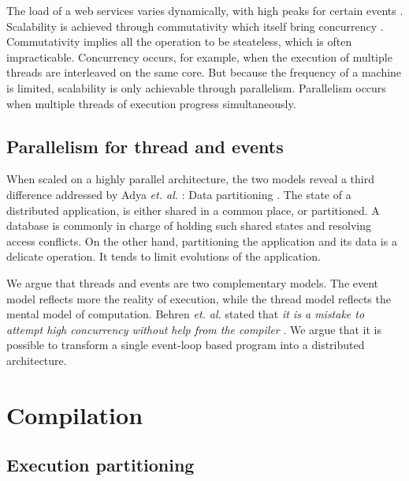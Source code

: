 The load of a web services varies dynamically, with high peaks for certain events%
.
Scalability is achieved through commutativity which itself bring concurrency \cite{Clements2013a}.
Commutativity implies all the operation to be steateless, which is often impracticable.
Concurrency occurs, for example, when the execution of multiple threads are interleaved on the same core.
But because the frequency of a machine is limited, scalability is only achievable through parallelism.
Parallelism occurs when multiple threads of execution progress simultaneously.

\subsection{Parallelism for thread and events}

When scaled on a highly parallel architecture, the two models reveal a third difference addressed by Adya \textit{et. al.} : Data partitioning \cite{Adya2002}.
The state of a distributed application, is either shared in a common place, or partitioned.
A database is commonly in charge of holding such shared states and resolving access conflicts.
On the other hand, partitioning the application and its data is a delicate operation.
It tends to limit evolutions of the application.

We argue that threads and events are two complementary models.
The event model reflects more the reality of execution, while the thread model reflects the mental model of computation.
Behren \textit{et. al.} stated that \textit{it is a mistake to attempt high concurrency without help from the compiler} \cite{Behren2003}.
We argue that it is possible to transform a single event-loop based program into a distributed architecture.

\section{Compilation}

\subsection{Execution partitioning}

